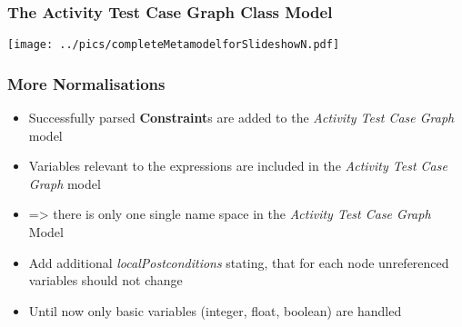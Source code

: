 \documentclass{beamer}
\newcommand{\UMLType}[1]{\textbf{#1}}
\begin{document}
\begin{frame}
\frametitle{The Activity Test Case Graph Class Model}
	\texttt{[image: ../pics/completeMetamodelforSlideshowN.pdf]}
\end{frame}


\begin{frame}
\frametitle{More Normalisations}
\begin{itemize}
\item Successfully parsed \UMLType{Constraint}s are added to the \emph{Activity Test Case Graph} model
\item Variables relevant to the expressions are included in the \emph{Activity Test Case Graph} model
\item => there is only one single name space in the \emph{Activity Test Case Graph} Model
\item Add additional \emph{localPostconditions} stating, that for each node unreferenced variables should not change
\item Until now only basic variables (integer, float, boolean) are handled
\end{itemize}
\end{frame}
\end{document}
